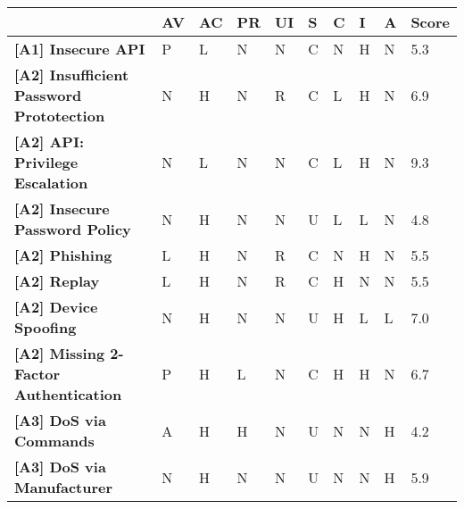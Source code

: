 \begin{sidewaystable}[ph!]
\centering
\sffamily
\begin{tabularx}{\textwidth}{|l|X|X|X|X|X|X|X|X|l|}
\hline
                                                     & \textbf{AV} & \textbf{AC} & \textbf{PR} & \textbf{UI} & \textbf{S} & \textbf{C} & \textbf{I} & \textbf{A} & \textbf{Score} \\ \hline
\textbf{{[}A1{]} Insecure API}                       & P           & L           & N           & N           & C          & N          & H          & N          & 5.3            \\ \hline
\textbf{{[}A2{]} Insufficient Password Prototection} & N           & H           & N           & R           & C          & L          & H          & N          & 6.9            \\ \hline
\textbf{{[}A2{]} API: Privilege Escalation}          & N           & L           & N           & N           & C          & L          & H          & N          & 9.3            \\ \hline
\textbf{{[}A2{]} Insecure Password Policy}           & N           & H           & N           & N           & U          & L          & L          & N          & 4.8            \\ \hline
\textbf{{[}A2{]} Phishing}                           & L           & H           & N           & R           & C          & N          & H          & N          & 5.5            \\ \hline
\textbf{{[}A2{]} Replay}                             & L           & H           & N           & R           & C          & H          & N          & N          & 5.5            \\ \hline
\textbf{{[}A2{]} Device Spoofing}                    & N           & H           & N           & N           & U          & H          & L          & L          & 7.0            \\ \hline
\textbf{{[}A2{]} Missing 2-Factor Authentication}    & P           & H           & L           & N           & C          & H          & H          & N          & 6.7            \\ \hline
\textbf{{[}A3{]} DoS via Commands}                   & A           & H           & H           & N           & U          & N          & N          & H          & 4.2            \\ \hline
\textbf{{[}A3{]} DoS via Manufacturer}               & N           & H           & N           & N           & U          & N          & N          & H          & 5.9            \\ \hline

\end{tabularx}
\end{sidewaystable}
